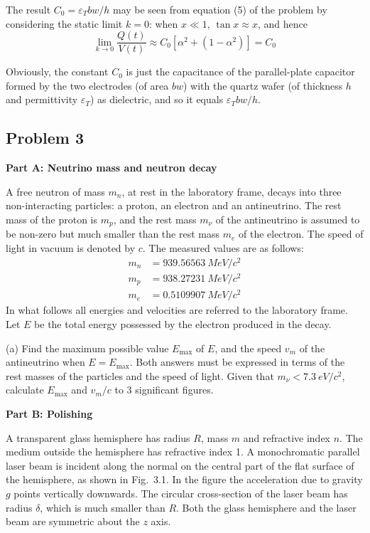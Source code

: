 \begin{note}
The result $C_0=\varepsilon_Tbw/h$ may be seen from equation (5) of the problem by considering the static limit $k=0$: when $x\ll1$, $\tan x\approx x$, and hence
\begin{equation}
\lim_{k\to0}\frac{Q(t)}{V(t)}\approx C_0\left[\alpha^2+(1-\alpha^2)\right]=C_0 \tag{B26}
\end{equation}
\end{note}

Obviously, the constant $C_0$ is just the capacitance of the parallel-plate capacitor formed by the two electrodes (of area $bw$) with the quartz wafer (of thickness $h$ and permittivity $\varepsilon_T$) as dielectric, and so it equals $\varepsilon_Tbw/h$.

\subsection*{Problem 3}

\textbf{Part A: Neutrino mass and neutron decay}

A free neutron of mass $m_n$, at rest in the laboratory frame, decays into three non-interacting particles: a proton, an electron and an antineutrino. The rest mass of the proton is $m_p$, and the rest mass $m_\nu$ of the antineutrino is assumed to be non-zero but much smaller than the rest mass $m_e$ of the electron. The speed of light in vacuum is denoted by $c$. The measured values are as follows:
\begin{align*}
m_n &= \SI{939.56563}{MeV/c^2}\\
m_p &= \SI{938.27231}{MeV/c^2}\\
m_e &= \SI{0.5109907}{MeV/c^2}
\end{align*}
In what follows all energies and velocities are referred to the laboratory frame. Let $E$ be the total energy possessed by the electron produced in the decay.

(a) Find the maximum possible value $E_{\max}$ of $E$, and the speed $v_m$ of the antineutrino when $E=E_{\max}$. Both answers must be expressed in terms of the rest masses of the particles and the speed of light. Given that $m_\nu<\SI{7.3}{eV/c^2}$, calculate $E_{\max}$ and $v_m/c$ to 3 significant figures.

\textbf{Part B: Polishing}

A transparent glass hemisphere has radius $R$, mass $m$ and refractive index $n$. The medium outside the hemisphere has refractive index 1. A monochromatic parallel laser beam is incident along the normal on the central part of the flat surface of the hemisphere, as shown in Fig.~3.1. In the figure the acceleration due to gravity $g$ points vertically downwards. The circular cross-section of the laser beam has radius $\delta$, which is much smaller than $R$. Both the glass hemisphere and the laser beam are symmetric about the $z$ axis.

